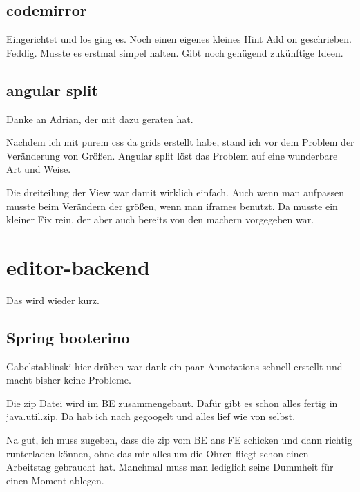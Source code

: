 \subsection{codemirror}\label{subsec:codemirror}
Eingerichtet und los ging es.
Noch einen eigenes kleines Hint Add on geschrieben.
Feddig.
Musste es erstmal simpel halten.
Gibt noch genügend zukünftige Ideen.

\subsection{angular split}\label{subsec:angular-split}
Danke an Adrian, der mit dazu geraten hat.

Nachdem ich mit purem css da grids erstellt habe, stand ich vor dem Problem der Veränderung von Größen.
Angular split löst das Problem auf eine wunderbare Art und Weise.

Die dreiteilung der View war damit wirklich einfach.
Auch wenn man aufpassen musste beim Verändern der größen, wenn man iframes benutzt.
Da musste ein kleiner Fix rein, der aber auch bereits von den machern vorgegeben war.

\section{editor-backend}\label{sec:editor-backend}
Das wird wieder kurz.

\subsection{Spring booterino}\label{subsec:spring-booterino}
Gabelstablinski hier drüben war dank ein paar Annotations schnell erstellt und macht bisher keine Probleme.

Die zip Datei wird im BE zusammengebaut.
Dafür gibt es schon alles fertig in java.util.zip.
Da hab ich nach gegoogelt und alles lief wie von selbst.

Na gut, ich muss zugeben, dass die zip vom BE ans FE schicken und dann richtig runterladen können,
ohne das mir alles um die Ohren fliegt schon einen Arbeitstag gebraucht hat.
Manchmal muss man lediglich seine Dummheit für einen Moment ablegen.